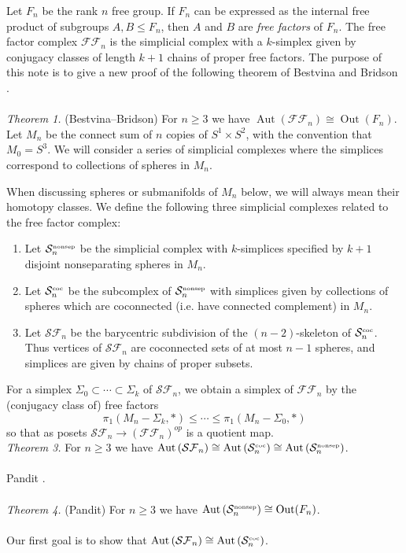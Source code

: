 \documentclass[12pt]{article}
\newcommand{\Aut}[1]{\ensuremath{ \aaut \left (#1 \right ) }}
\newcommand{\outn}{{\ensuremath{ \oout(F_n)}} }
\newcommand{\nosep}{{\ensuremath{ \mathcal S^{\mbox{\tiny{nonsep}}}_n }}}
\newcommand{\coc}[1]{{\ensuremath{ \mathcal S^{\mbox{\tiny{coc}}}_{#1} }}}
\newcommand{\ffn}{{\ensuremath{ \mathcal {FF}_n }}}
\newcommand{\sfn}{{\ensuremath{ \mathcal {SF}_n }}}
\DeclareMathOperator{\oout}{Out}
\DeclareMathOperator{\aaut}{Aut}
\begin{document}
Let $F_n$ be the rank $n$ free group.
If $F_n$ can be expressed as the internal free product of subgroups $A,B \leqslant F_n$, then $A$ and $B$ are \emph{free factors} of $F_n$.
The free factor complex $\mathcal {FF}_n$ is the simplicial complex with a $k$-simplex given by conjugacy classes of length $k+1$ chains of proper free factors.
The purpose of this note is to give a new proof of the following theorem of Bestvina and Bridson \cite{bridson}.\\
\\
\noindent \emph{Theorem 1.} (Bestvina--Bridson) For $n \geq 3$ we have $\Aut{\ffn} \cong \outn$.\\

Let $M_{n}$ be the connect sum of $n$ copies of  $S^1 \times S^2$, with the convention that $M_0 =S^3$.
We will consider a series of simplicial complexes where the simplices correspond to collections of spheres in 
$M_n$.

When discussing spheres or submanifolds of $M_n$ below, we will always mean their homotopy classes.
We define the following three simplicial complexes related to the free factor complex:
\begin{enumerate}[$\cdot$]
\item
Let $\nosep$ be the simplicial complex with $k$-simplices specified by $k+1$ disjoint nonseparating spheres in $M_n$.
\item
Let $\coc n$ be the subcomplex of $\nosep$ with simplices given by collections of spheres which are coconnected (i.e. have connected complement) in $M_n$.
\item
Let $\sfn$ be the barycentric subdivision of the $(n-2)$-skeleton of $\coc n$. Thus vertices of $\sfn$ are coconnected sets of at most $n-1$ spheres, and simplices are given by chains of proper subsets.
\end{enumerate}
For a simplex $\Sigma_0 \subset \cdots \subset \Sigma_k$ of $\sfn$, we obtain a simplex of $\ffn$ by the (conjugacy class of) free factors $$\pi_1(M_n-\Sigma_k,\ast) \leqslant \cdots \leqslant \pi_1(M_n-\Sigma_0,\ast)$$ so that as posets $\sfn \to (\ffn)^{op}$ is a quotient map.
\\
\noindent \emph{Theorem 3.} For $n \geq 3$ we have
$\Aut{\sfn} \cong \Aut{\coc n} \cong \Aut{\nosep}$.\\
\\
Pandit \cite{pandit}.\\
\\
\emph{Theorem 4.} (Pandit) For $n \geq 3$ we have $\Aut{\nosep} \cong \outn$.\\
\\
Our first goal is to show that $\Aut{\sfn} \cong \Aut{\coc n}$.
\end{document}
